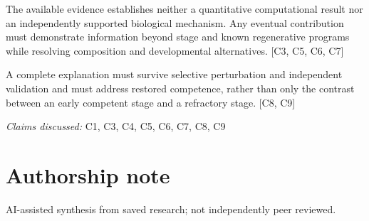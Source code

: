 \documentclass[11pt]{article}
\begin{document}
The available evidence establishes neither a quantitative computational result nor an independently supported biological mechanism. Any eventual contribution must demonstrate information beyond stage and known regenerative programs while resolving composition and developmental alternatives. [C3, C5, C6, C7]

A complete explanation must survive selective perturbation and independent validation and must address restored competence, rather than only the contrast between an early competent stage and a refractory stage. [C8, C9]

\textit{Claims discussed: }C1, C3, C4, C5, C6, C7, C8, C9
\section*{Authorship note}
AI-assisted synthesis from saved research; not independently peer reviewed.
\end{document}

